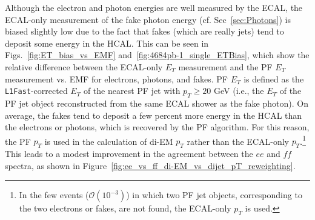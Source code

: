 \documentclass[dissertation.tex]{subfiles}
\begin{document}
Although the electron and photon energies are well measured by the ECAL, the ECAL-only measurement of the fake photon energy (cf. Sec~\ref{sec:Photons}) is biased slightly low due to the fact that fakes (which are really jets) tend to deposit some energy in the HCAL.  This can be seen in Figs.~\ref{fig:ET_bias_vs_EMF} and~\ref{fig:4684pb-1_single_ETBias}, which show the relative difference between the ECAL-only $E_{T}$ measurement and the PF $E_{T}$ measurement vs. EMF for electrons, photons, and fakes.  PF $E_{T}$ is defined as the \verb+L1Fast+-corrected $E_{T}$ of the nearest PF jet with $p_{T} \geq 20$ GeV (i.e., the $E_{T}$ of the PF jet object reconstructed from the same ECAL shower as the fake photon).  On average, the fakes tend to deposit a few percent more energy in the HCAL than the electrons or photons, which is recovered by the PF algorithm.  For this reason, the PF $p_{T}$ is used in the calculation of di-EM $p_{T}$ rather than the ECAL-only $p_{T}$.\footnote{In the few events ($\mathcal{O}(10^{-3})$) in which two PF jet objects, corresponding to the two electrons or fakes, are not found, the ECAL-only $p_{T}$ is used.}  This leads to a modest improvement in the agreement between the $ee$ and $\mathit{ff}$ \MET spectra, as shown in Figure~\ref{fig:ee_vs_ff_di-EM_vs_dijet_pT_reweighting}.
\end{document}
